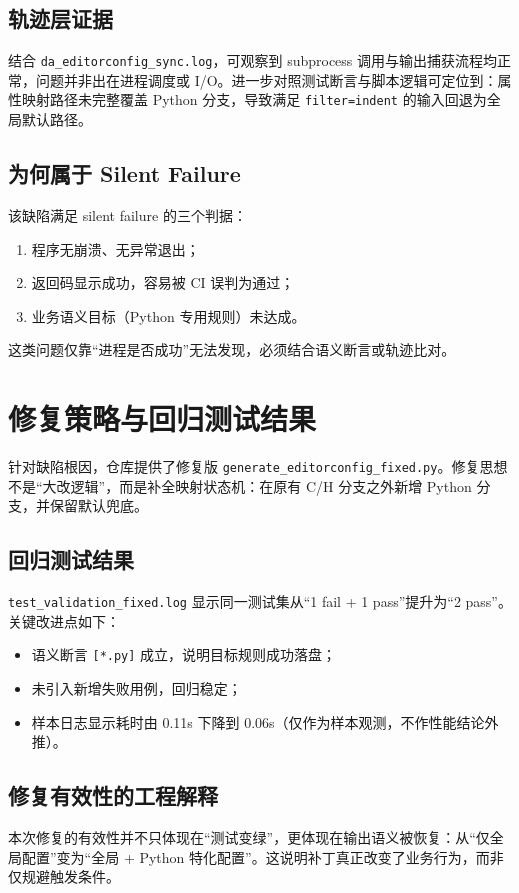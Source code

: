 \subsection*{轨迹层证据}
结合 \texttt{da\_editorconfig\_sync.log}，可观察到 subprocess 调用与输出捕获流程均正常，问题并非出在进程调度或 I/O。进一步对照测试断言与脚本逻辑可定位到：属性映射路径未完整覆盖 Python 分支，导致满足 \texttt{filter=indent} 的输入回退为全局默认路径。

\subsection*{为何属于 Silent Failure}
该缺陷满足 silent failure 的三个判据：
\begin{enumerate}
    \item 程序无崩溃、无异常退出；
    \item 返回码显示成功，容易被 CI 误判为通过；
    \item 业务语义目标（Python 专用规则）未达成。
\end{enumerate}

这类问题仅靠“进程是否成功”无法发现，必须结合语义断言或轨迹比对。

\section{修复策略与回归测试结果}
针对缺陷根因，仓库提供了修复版 \texttt{generate\_editorconfig\_fixed.py}。修复思想不是“大改逻辑”，而是补全映射状态机：在原有 C/H 分支之外新增 Python 分支，并保留默认兜底。

\subsection*{回归测试结果}
\texttt{test\_validation\_fixed.log} 显示同一测试集从“1 fail + 1 pass”提升为“2 pass”。关键改进点如下：
\begin{itemize}
    \item 语义断言 \texttt{[*.py]} 成立，说明目标规则成功落盘；
    \item 未引入新增失败用例，回归稳定；
    \item 样本日志显示耗时由 0.11s 下降到 0.06s（仅作为样本观测，不作性能结论外推）。
\end{itemize}

\subsection*{修复有效性的工程解释}
本次修复的有效性并不只体现在“测试变绿”，更体现在输出语义被恢复：从“仅全局配置”变为“全局 + Python 特化配置”。这说明补丁真正改变了业务行为，而非仅规避触发条件。

